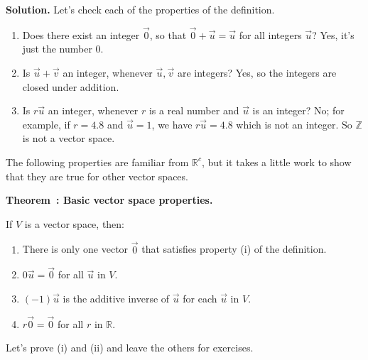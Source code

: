 \documentclass[11pt, letterpaper]{report}
\newenvironment{notes}{}{}
\newenvironment{book}{}{}
\newcounter{exercise}[section]
\newcounter{example}[section]
\newcounter{theorem}[chapter]
\newenvironment{theorem}[1][]{\refstepcounter{theorem}\begin{bbox}\par
    \noindent\textbf{Theorem~\thetheorem: #1}}{\end{bbox}}
\newlength\oldfboxsep%
\newlength\myminiwidth%
\newenvironment{bbox}{%
  \setlength\oldfboxsep\fboxsep
  \setlength{\fboxsep}{.1in}%
  \setlength\myminiwidth\linewidth%
  \addtolength\myminiwidth{-0.2in}%
  \vspace{0.1in}%
  \begin{lrbox}{\bboxbox}\begin{minipage}{\myminiwidth}%
    }{%
    \end{minipage}\end{lrbox}%
  \noindent\fbox{\usebox{\bboxbox}}\vspace{0.1in}\setlength\fboxsep\oldfboxsep%
}
\newcommand{\R}{\mathbb{R}}
\begin{document}
\begin{notes}
\vfill
\vfill
\newpage
\end{notes}

\begin{book}
\textbf{Solution.} Let's check each of the properties of the definition.
\begin{enumerate}[label=(\roman*)]
\item Does there exist an integer $\vec{0}$, so that $\vec{0}+\vec{u}=\vec{u}$ for all integers $\vec{u}$? Yes, it's just the number $0$.
\item Is $\vec{u}+\vec{v}$ an integer, whenever $\vec{u},\vec{v}$ are integers? Yes, so the integers are closed under addition.
\item Is $r\vec{u}$ an integer, whenever $r$ is a real number and $\vec{u}$ is an integer? No; for example, if $r=4.8$ and $\vec{u}=1$, we have $r\vec{u}=4.8$ which is not an integer. So $\mathbb{Z}$ is not a vector space. \blacksquare
\end{enumerate}
\end{book}

The following properties are familiar from $\R^c$, but it takes a little work to show that they are true for other vector spaces.

\begin{theorem}[Basic vector space properties.]\label{theorem:vector-space-properties} 

If $V$ is a vector space, then:

\begin{enumerate}[label=(\roman*)]
\item There is only one vector $\vec{0}$ that satisfies property (i) of the definition.
\item $0\vec{u}=\vec{0}$ for all $\vec{u}$ in $V$.
\item $(-1)\vec{u}$ is the additive inverse of $\vec{u}$ for each $\vec{u}$ in $V$.
\item $r\vec{0}=\vec{0}$ for all $r$ in $\R$.
\end{enumerate}
\end{theorem}
Let's prove (i) and (ii) and leave the others for exercises.

\begin{notes}
\vfill
\vfill
\end{notes}
\end{document}
